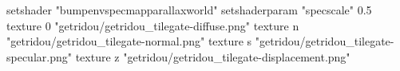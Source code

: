 setshader "bumpenvspecmapparallaxworld"
setshaderparam "specscale" 0.5
texture 0 "getridou/getridou_tilegate-diffuse.png"
texture n "getridou/getridou_tilegate-normal.png"
texture s "getridou/getridou_tilegate-specular.png"
texture z "getridou/getridou_tilegate-displacement.png"
